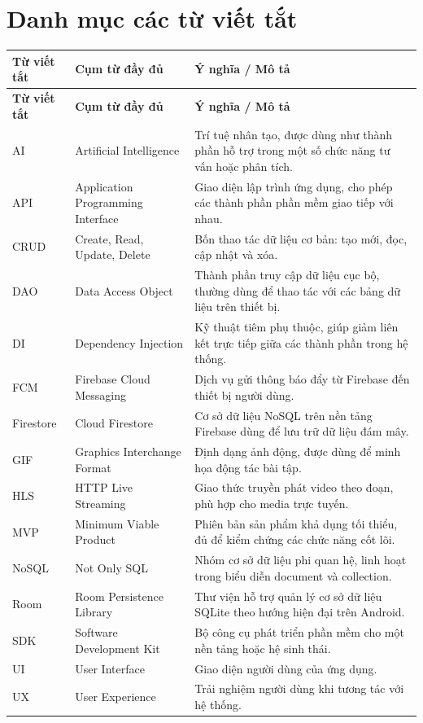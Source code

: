 ﻿\chapter*{Danh mục các từ viết tắt}

\footnotesize
\begin{longtable}{|p{1.7cm}|p{3.9cm}|p{5.9cm}|}
\hline
\textbf{Từ viết tắt} & \textbf{Cụm từ đầy đủ} & \textbf{Ý nghĩa / Mô tả} \\ \hline
\endfirsthead
\hline
\textbf{Từ viết tắt} & \textbf{Cụm từ đầy đủ} & \textbf{Ý nghĩa / Mô tả} \\ \hline
\endhead
AI & Artificial Intelligence & Trí tuệ nhân tạo, được dùng như thành phần hỗ trợ trong một số chức năng tư vấn hoặc phân tích. \\ \hline
API & Application Programming Interface & Giao diện lập trình ứng dụng, cho phép các thành phần phần mềm giao tiếp với nhau. \\ \hline
CRUD & Create, Read, Update, Delete & Bốn thao tác dữ liệu cơ bản: tạo mới, đọc, cập nhật và xóa. \\ \hline
DAO & Data Access Object & Thành phần truy cập dữ liệu cục bộ, thường dùng để thao tác với các bảng dữ liệu trên thiết bị. \\ \hline
DI & Dependency Injection & Kỹ thuật tiêm phụ thuộc, giúp giảm liên kết trực tiếp giữa các thành phần trong hệ thống. \\ \hline
FCM & Firebase Cloud Messaging & Dịch vụ gửi thông báo đẩy từ Firebase đến thiết bị người dùng. \\ \hline
Firestore & Cloud Firestore & Cơ sở dữ liệu NoSQL trên nền tảng Firebase dùng để lưu trữ dữ liệu đám mây. \\ \hline
GIF & Graphics Interchange Format & Định dạng ảnh động, được dùng để minh họa động tác bài tập. \\ \hline
HLS & HTTP Live Streaming & Giao thức truyền phát video theo đoạn, phù hợp cho media trực tuyến. \\ \hline
MVP & Minimum Viable Product & Phiên bản sản phẩm khả dụng tối thiểu, đủ để kiểm chứng các chức năng cốt lõi. \\ \hline
NoSQL & Not Only SQL & Nhóm cơ sở dữ liệu phi quan hệ, linh hoạt trong biểu diễn document và collection. \\ \hline
Room & Room Persistence Library & Thư viện hỗ trợ quản lý cơ sở dữ liệu SQLite theo hướng hiện đại trên Android. \\ \hline
SDK & Software Development Kit & Bộ công cụ phát triển phần mềm cho một nền tảng hoặc hệ sinh thái. \\ \hline
UI & User Interface & Giao diện người dùng của ứng dụng. \\ \hline
UX & User Experience & Trải nghiệm người dùng khi tương tác với hệ thống. \\ \hline
\end{longtable}
\normalsize
